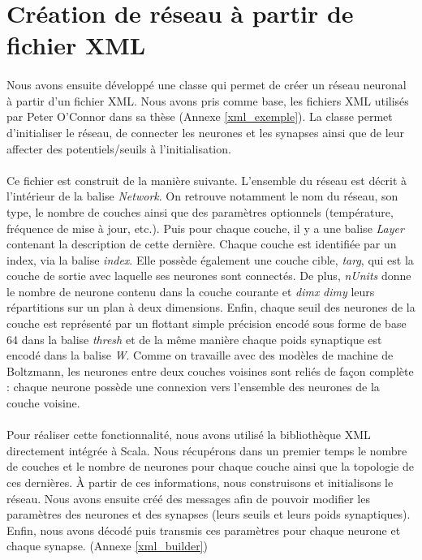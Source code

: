 \documentclass[a4paper,10pt]{article}
\begin{document}
\newpage

\section{Création de réseau à partir de fichier XML}

\paragraph{}
Nous avons ensuite développé une classe qui permet de créer un réseau neuronal à partir d’un fichier XML.
Nous avons pris comme base, les fichiers XML utilisés par Peter O’Connor dans sa thèse (Annexe \ref{xml_exemple}). La classe permet d’initialiser le réseau, de connecter les neurones et les synapses ainsi que de leur affecter des potentiels/seuils à l’initialisation.

\paragraph{}
Ce fichier est construit de la manière suivante. L'ensemble du réseau est décrit à l'intérieur de la balise \emph{Network}. On retrouve notamment le nom du réseau, son type, le nombre de couches ainsi que des paramètres optionnels (température, fréquence de mise à jour, etc.). Puis pour chaque couche, il y a une balise \emph{Layer} contenant la description de cette dernière. Chaque couche est identifiée par un index, via la balise \emph{index}. Elle possède également une couche cible, \emph{targ}, qui est la couche de sortie avec laquelle ses neurones sont connectés. De plus, \emph{nUnits} donne le nombre de neurone contenu dans la couche courante et \emph{dimx} \emph{dimy} leurs répartitions sur un plan à deux dimensions. Enfin, chaque seuil des neurones de la couche est représenté par un flottant simple précision encodé sous forme de base 64 dans la balise \emph{thresh} et de la même manière chaque poids synaptique est encodé dans la balise \emph{W}. Comme on travaille avec des modèles de machine de Boltzmann, les neurones entre deux couches voisines sont reliés de façon complète : chaque neurone possède une connexion vers l'ensemble des neurones de la couche voisine.

\paragraph{}
Pour réaliser cette fonctionnalité, nous avons utilisé la bibliothèque XML directement intégrée à Scala. Nous récupérons dans un premier temps le nombre de couches et le nombre de neurones pour chaque couche ainsi que la topologie de ces dernières. À partir de ces informations, nous construisons et initialisons le réseau. Nous avons ensuite créé des messages afin de pouvoir modifier les paramètres des neurones et des synapses (leurs seuils et leurs poids synaptiques). Enfin, nous avons décodé puis transmis ces paramètres pour chaque neurone et chaque synapse. (Annexe \ref{xml_builder})
\end{document}
